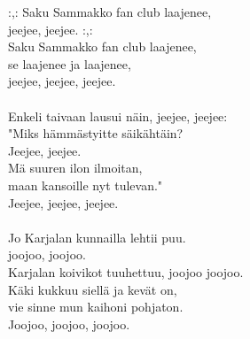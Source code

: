            :,: Saku Sammakko fan club laajenee, \\
            jeejee, jeejee. :,: \\
            Saku Sammakko fan club laajenee, \\
            se laajenee ja laajenee, \\
            jeejee, jeejee, jeejee. \\
\hspace{10mm} \\
            Enkeli taivaan lausui näin, jeejee, jeejee: \\
            "Miks hämmästyitte säikähtäin? \\
            Jeejee, jeejee. \\
            Mä suuren ilon ilmoitan,  \\
            maan kansoille nyt tulevan."  \\
            Jeejee, jeejee, jeejee. \\
\hspace{10mm} \\
            Jo Karjalan kunnailla lehtii puu. \\
            joojoo, joojoo. \\
            Karjalan koivikot tuuhettuu, joojoo joojoo. \\
            Käki kukkuu siellä ja kevät on,  \\
            vie sinne mun kaihoni pohjaton.  \\
            Joojoo, joojoo, joojoo. \\
\hspace{10mm} \\
            \begin{comment} Lisäsäkeistö: \\
\hspace{10mm} \\
            :,: Sai myös Saku muiston itselleen, \\
            ai ai, ai ai. :,: \\
            Sai myös Saku muiston itselleen,  \\
            satiaisen, kupan ja syfiliksen,  \\
            aih aih, aih aih, aih aih. \\
\end{comment}